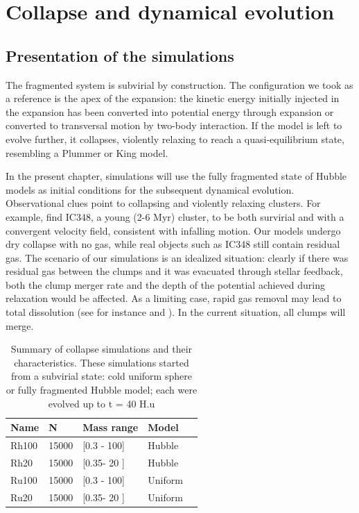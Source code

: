 

\chapter{Collapse and dynamical evolution}



\section{Presentation of the simulations}

The \tHub fragmented system is subvirial by construction. The configuration we took as a reference is the apex of the expansion: the kinetic energy initially injected in the expansion has been converted into potential energy through expansion or converted to transversal motion by two-body interaction. If the model is left to evolve further, it collapses, violently relaxing to reach a quasi-equilibrium state, resembling a Plummer or King model.

In the present chapter, simulations will use the fully fragmented state of Hubble models as initial conditions for the subsequent dynamical evolution. Observational clues point to  collapsing and violently relaxing clusters. For example, \cite{Cottaar2015} find IC348, a young (2-6 Myr) cluster, to be both survirial and with a convergent velocity field, consistent with infalling motion. Our models undergo dry collapse with no gas, while real objects such as IC348 still contain residual gas. The scenario of our simulations is an idealized situation: clearly if there was residual gas between the clumps and it was evacuated through stellar feedback, both the clump merger rate and the depth of the potential achieved during relaxation would be affected. As a limiting case, rapid gas removal may lead to total dissolution (see for instance \citealt{Moeckel2012} and \citealt{Fujii2016}). In the current situation, all clumps will merge. 


\begin{table}
\begin{center}
\caption{Summary of collapse simulations and their characteristics. These simulations started from a subvirial state: cold uniform sphere or fully fragmented Hubble model; each were evolved up to t = 40 H.u}
\label{Tab:evolution_models}
\begin{tabularx}{\columnwidth}{XXlXX}
\hline
Name & N & Mass range & Model \\
\hline
Rh100 & 15000 & [0.3 - 100] & Hubble  \\
Rh20 & 15000 & [0.35- 20 ] & Hubble  \\
Ru100 & 15000 & [0.3 - 100] & Uniform  \\
Ru20 & 15000 & [0.35- 20 ] & Uniform  \\
\hline
\end{tabularx}
\end{center}
\end{table}



